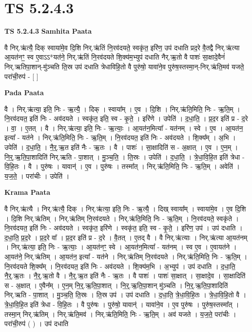 \documentclass[17pt]{extarticle}
\begin{document}
\section{ TS 5.2.4.3 }

\textbf{TS 5.2.4.3 } \newline
\textbf{Samhita Paata} \newline

वै निर्.ऋ॑त्यै॒ दिक् स्वाया॑मे॒व दि॒शि निर्.ऋ॑तिं नि॒रव॑दयते॒ स्वकृ॑त॒ इरि॑ण॒ उप॑ दधाति प्रद॒रे वै॒तद्वै निर्.ऋ॑त्या आ॒यत॑नꣳ॒॒ स्व ए॒वाऽऽ*यत॑ने॒ निर्.ऋ॑तिं नि॒रव॑दयते शि॒क्य॑म॒भ्युप॑ दधाति नैर्.ऋ॒तो वै पाशः॑ सा॒क्षादे॒वैनं॑ निर्.ऋतिपा॒शान्-मु॑ञ्चति ति॒स्र उप॑ दधाति त्रेधाविहि॒तो वै पुरु॑षो॒ यावा॑ने॒व पुरु॑ष॒स्तस्मा॒न्-निर्.ऋ॑ति॒मव॑ यजते॒ परा॑ची॒रुप॑ - [  ] \newline

\textbf{Pada Paata} \newline

वै । निर्.ऋ॑त्या॒ इति॒ निः - ऋ॒त्यै॒ । दिक् । स्वाया᳚म् । ए॒व । दि॒शि । निर्.ऋ॑ति॒मिति॒ निः - ऋ॒ति॒म् । नि॒रव॑दयत॒ इति॑ निः - अव॑दयते । स्वकृ॑त॒ इति॒ स्व - कृ॒ते॒ । इरि॑णे । उपेति॑ । द॒धा॒ति॒ । प्र॒द॒र इति॑ प्र - द॒रे । वा॒ । ए॒तत् । वै । निर्.ऋ॑त्या॒ इति॒ निः - ऋ॒त्याः॒ । आ॒यत॑न॒मित्या᳚ - यत॑नम् । स्वे । ए॒व । आ॒यत॑न॒ इत्या᳚ - यत॑ने । निर्.ऋ॑ति॒मिति॒ निः - ऋ॒ति॒म् । नि॒रव॑दयत॒ इति॑ निः - अव॑दयते । शि॒क्य᳚म् । अ॒भि । उपेति॑ । द॒धा॒ति॒ । नै॒र्॒.ऋ॒त इति॑ नैः - ऋ॒तः । वै । पाशः॑ । सा॒क्षादिति॑ स - अ॒क्षात् । ए॒व । ए॒न॒म् । नि॒र्॒.ऋ॒ति॒पा॒शादिति॑ निर्.ऋति - पा॒शात् । मु॒ञ्च॒ति॒ । ति॒स्रः । उपेति॑ । द॒धा॒ति॒ । त्रे॒धा॒वि॒हि॒त इति॑ त्रेधा - वि॒हि॒तः । वै । पुरु॑षः । यावान्॑ । ए॒व । पुरु॑षः । तस्मा᳚त् । निर्.ऋ॑ति॒मिति॒ निः - ऋ॒ति॒म् । अवेति॑ । य॒ज॒ते॒ । परा॑चीः । उपेति॑ ।  \newline


\textbf{Krama Paata} \newline

वै निर्.ऋ॑त्यै । निर्.ऋ॑त्यै॒ दिक् । निर्.ऋ॑त्या॒ इति॒ निः - ऋ॒त्यै॒ । दिख् स्वाया᳚म् । स्वाया॑मे॒व । ए॒व दि॒शि । दि॒शि निर्.ऋ॑तिम् । निर्.ऋ॑तिम् नि॒रव॑दयते । निर्.ऋ॑ति॒मिति॒ निः - ऋ॒ति॒म् । नि॒रव॑दयते॒ स्वकृ॑ते । नि॒रव॑दयत॒ इति॑ निः - अव॑दयते । स्वकृ॑त॒ इरि॑णे । स्वकृ॑त॒ इति॒ स्व - कृ॒ते॒ । इरि॑ण॒ उप॑ । उप॑ दधाति । द॒धा॒ति॒ प्र॒द॒रे । प्र॒द॒रे वा᳚ । प्र॒द॒र इति॑ प्र - द॒रे । वै॒तत् । ए॒तद् वै । वै निर्.ऋ॑त्याः । निर्.ऋ॑त्या आ॒यत॑नम् । निर्.ऋ॑त्या॒ इति॒ निः - ऋ॒त्याः॒ । आ॒यत॑नꣳ॒॒ स्वे । आ॒यत॑न॒मित्या᳚ - यत॑नम् । स्व ए॒व । ए॒वायत॑ने । आ॒यत॑ने॒ निर्.ऋ॑तिम् । आ॒यत॑न॒ इत्या᳚ - यत॑ने । निर्.ऋ॑तिम् नि॒रव॑दयते । निर्.ऋ॑ति॒मिति॒ निः - ऋ॒ति॒म् । नि॒रव॑दयते शि॒क्य᳚म् । नि॒रव॑दयत॒ इति॑ निः - अव॑दयते । शि॒क्य॑म॒भि । अ॒भ्युप॑ । उप॑ दधाति । द॒धा॒ति॒ नै॒र्॒.ऋ॒तः । नै॒र्॒.ऋ॒तो वै । नै॒र्॒.ऋ॒त इति॑ नैः - ऋ॒तः । वै पाशः॑ । पाशः॑ सा॒क्षात् । सा॒क्षादे॒व । सा॒क्षादिति॑ स - अ॒क्षात् । ए॒वैन᳚म् । ए॒न॒म् नि॒र्॒.ऋ॒ति॒पा॒शात् । नि॒र्॒.ऋ॒ति॒पा॒शान् मु॑ञ्चति । नि॒र्॒.ऋ॒ति॒पा॒शादिति॑ निर्.ऋति - पा॒शात् । मु॒ञ्च॒ति॒ ति॒स्रः । ति॒स्र उप॑ । उप॑ दधाति । द॒धा॒ति॒ त्रे॒धा॒वि॒हि॒तः । त्रे॒धा॒वि॒हि॒तो वै । त्रे॒धा॒वि॒हि॒त इति॑ त्रेधा - वि॒हि॒तः । वै पुरु॑षः । पुरु॑षो॒ यावान्॑ । यावा॑ने॒व । ए॒व पुरु॑षः । पुरु॑ष॒स्तस्मा᳚त् । तस्मा॒न् निर्.ऋ॑तिम् । निर्.ऋ॑ति॒मव॑ । निर्.ऋ॑ति॒मिति॒ निः - ऋ॒ति॒म् । अव॑ यजते । य॒ज॒ते॒ परा॑चीः । परा॑ची॒रुप॑ ( ) । उप॑ दधाति \newline
\end{document}
